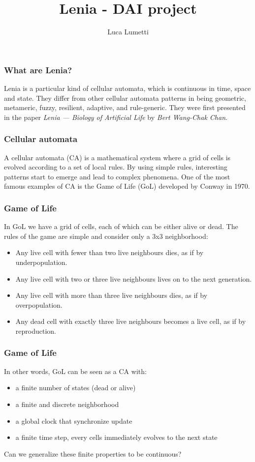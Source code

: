 \documentclass{beamer}
\title{Lenia - DAI project}
\author[Luca Lumetti]{Luca Lumetti}
\begin{document}
\frame{\titlepage}

\begin{frame}
\frametitle{What are Lenia?}
  Lenia is a particular kind of cellular automata, which is continuous in time,
  space and state. They differ from other cellular automata patterns in being
  geometric, metameric, fuzzy, resilient, adaptive, and rule-generic. They were
  first presented in the paper \emph{Lenia — Biology of Artificial Life} by
  \emph{Bert Wang-Chak Chan}.
\end{frame}

\begin{frame}
  \frametitle{Cellular automata}
  A cellular automata (CA) is a mathematical system where a grid of cells is
  evolved according to a set of local rules. By using simple rules, interesting
  patterns start to emerge and lead to complex phenomena. One of the most famous
  examples of CA is the Game of Life (GoL) developed by Conway in 1970.
\end{frame}

\begin{frame}
  \frametitle{Game of Life}
  In GoL we have a grid of cells, each of which can be either alive or dead. The
  rules of the game are simple and consider only a 3x3 neighborhood:
  \begin{itemize}
    \item Any live cell with fewer than two live neighbours dies, as if by
          underpopulation.
    \item Any live cell with two or three live neighbours lives on to the next
          generation.
    \item Any live cell with more than three live neighbours dies, as if by
          overpopulation.
    \item Any dead cell with exactly three live neighbours becomes a live cell,
          as if by reproduction.
  \end{itemize}
\end{frame}

\begin{frame}
  \frametitle{Game of Life}
  In other words, GoL can be seen as a CA with:
  \begin{itemize}
    \item a finite number of states (dead or alive)
    \item a finite and discrete neighborhood
    \item a global clock that synchronize update
    \item a finite time step, every cells immediately evolves to the next state
  \end{itemize}
  Can we generalize these finite properties to be continuous?
\end{frame}
\end{document}
